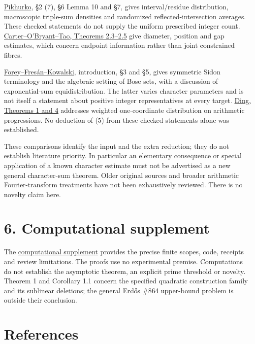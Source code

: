 \documentclass[11pt,a4paper]{article}
\begin{document}
\href{https://opikhurko.warwick.ac.uk/E/Pikhurko06dm.pdf}{Pikhurko}, §2 (7), §6 Lemma 10 and §7, gives interval/residue distribution, macroscopic triple-sum densities and randomized reflected-intersection averages. These checked statements do not supply the uniform prescribed integer count. \href{https://arxiv.org/pdf/2610.36207v1}{Carter--O'Bryant--Tao, Theorems 2.3--2.5} give diameter, position and gap estimates, which concern endpoint information rather than joint constrained fibres.

\href{https://arxiv.org/pdf/2301.12878v3}{Forey--Fresán--Kowalski}, introduction, §3 and §5, gives symmetric Sidon terminology and the algebraic setting of Bose sets, with a discussion of exponential-sum equidistribution. The latter varies character parameters and is not itself a statement about positive integer representatives at every target. \href{https://arxiv.org/pdf/2606.15041v2}{Ding, Theorems 1 and 4} addresses weighted one-coordinate distribution on arithmetic progressions. No deduction of (5) from these checked statements alone was established.

These comparisons identify the input and the extra reduction; they do not establish literature priority. In particular an elementary consequence or special application of a known character estimate must not be advertised as a new general character-sum theorem. Older original sources and broader arithmetic Fourier-transform treatments have not been exhaustively reviewed. There is no novelty claim here.

\section{6. Computational supplement}\label{computational-supplement}

The \href{https://github.com/miyosep/erdos-864-c021/blob/main/review/COMPUTATIONAL_SUPPLEMENT.md}{computational supplement} provides the precise finite scopes, code, receipts and review limitations. The proofs use no experimental premise. Computations do not establish the asymptotic theorem, an explicit prime threshold or novelty. Theorem 1 and Corollary 1.1 concern the specified quadratic construction family and its sublinear deletions; the general Erdős \#864 upper-bound problem is outside their conclusion.

\sloppy\section{References}\label{references}
\end{document}
